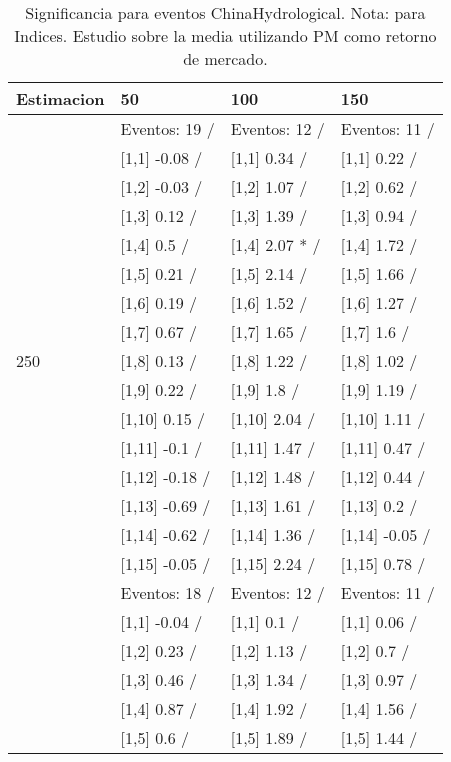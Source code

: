 \begin{table}

\caption{Significancia para eventos ChinaHydrological. Nota: para Indices. Estudio sobre la media utilizando PM como retorno de mercado.}
\centering
\begin{tabular}[t]{llll}
\toprule
Estimacion & 50 & 100 & 150\\
\midrule
 & Eventos:  19 / & Eventos:  12 / & Eventos:  11 /\\
 & {}[1,1] -0.08  / & {}[1,1] 0.34  / & {}[1,1] 0.22  /\\
 & {}[1,2] -0.03  / & {}[1,2] 1.07  / & {}[1,2] 0.62  /\\
 & {}[1,3] 0.12  / & {}[1,3] 1.39  / & {}[1,3] 0.94  /\\
 & {}[1,4] 0.5  / & {}[1,4] 2.07 * / & {}[1,4] 1.72  /\\
\addlinespace
 & {}[1,5] 0.21  / & {}[1,5] 2.14  / & {}[1,5] 1.66  /\\
 & {}[1,6] 0.19  / & {}[1,6] 1.52  / & {}[1,6] 1.27  /\\
 & {}[1,7] 0.67  / & {}[1,7] 1.65  / & {}[1,7] 1.6  /\\
250 & {}[1,8] 0.13  / & {}[1,8] 1.22  / & {}[1,8] 1.02  /\\
 & {}[1,9] 0.22  / & {}[1,9] 1.8  / & {}[1,9] 1.19  /\\
\addlinespace
 & {}[1,10] 0.15  / & {}[1,10] 2.04  / & {}[1,10] 1.11  /\\
 & {}[1,11] -0.1  / & {}[1,11] 1.47  / & {}[1,11] 0.47  /\\
 & {}[1,12] -0.18  / & {}[1,12] 1.48  / & {}[1,12] 0.44  /\\
 & {}[1,13] -0.69  / & {}[1,13] 1.61  / & {}[1,13] 0.2  /\\
 & {}[1,14] -0.62  / & {}[1,14] 1.36  / & {}[1,14] -0.05  /\\
\addlinespace
 & {}[1,15] -0.05  / & {}[1,15] 2.24  / & {}[1,15] 0.78  /\\
 & Eventos:  18 / & Eventos:  12 / & Eventos:  11 /\\
 & {}[1,1] -0.04  / & {}[1,1] 0.1  / & {}[1,1] 0.06  /\\
 & {}[1,2] 0.23  / & {}[1,2] 1.13  / & {}[1,2] 0.7  /\\
 & {}[1,3] 0.46  / & {}[1,3] 1.34  / & {}[1,3] 0.97  /\\
\addlinespace
 & {}[1,4] 0.87  / & {}[1,4] 1.92  / & {}[1,4] 1.56  /\\
 & {}[1,5] 0.6  / & {}[1,5] 1.89  / & {}[1,5] 1.44  /\\

\end{tabular}
\end{table}
